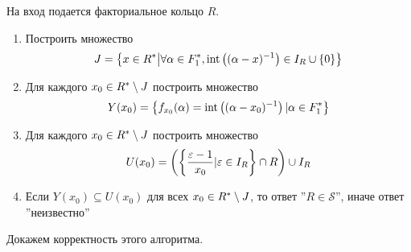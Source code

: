 \documentclass[_00_dissertation.tex]{subfiles}
\begin{document}
\begin{algorithm}\label{algorithm:R_in_S}
    На вход подается факториальное кольцо $R$.
    
    \begin{enumerate}
        \item Построить множество
        \begin{equation*}
            J = \left\{
                x \in R^{*} \big| \forall \alpha \in F_1^{*}, \textrm{int}\left((\alpha - x)^{-1}\right) \in I_{R} \cup \{0\}
            \right\}
        \end{equation*}
        
        \item Для каждого $x_0 \in R^{*} \setminus J$ построить множество
        \begin{equation*}
            Y(x_0) = \left\{
                f_{x_0}(\alpha) = \textrm{int}\left((\alpha - x_0)^{-1}\right) | \alpha \in F_1^{*}
            \right\}
        \end{equation*}
        
        \item Для каждого $x_0 \in R^{*} \setminus J$ построить множество
        \begin{equation*}
            U(x_0) = \left(
                \left\{
                    \frac{\varepsilon - 1}{x_0} | \varepsilon \in I_{R}
                \right\} \cap R
            \right) \cup I_{R}
        \end{equation*}
        
        \item Если $Y(x_0) \subseteq U(x_0)$ для всех $x_0 \in R^{*} \setminus J$, то ответ ''$R \in \mathcal{S}$'', иначе ответ ''неизвестно''
    \end{enumerate}
\end{algorithm}

Докажем корректность этого алгоритма.
\end{document}
